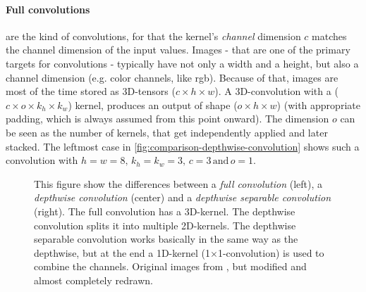 \paragraph{Full convolutions} are the kind of convolutions, for that the kernel's \emph{channel} dimension $c$ matches the channel dimension of the input values.
Images - that are one of the primary targets for convolutions - typically have not only a width and a height, but also a channel dimension (e.g. color channels, like rgb).
Because of that, images are most of the time stored as 3D-tensors ($c \times h \times w$).
A 3D-convolution with a ($c \times o \times k_h \times k_w$) kernel, produces an output of shape ($o \times h \times w$) (with appropriate padding, which is always assumed from this point onward).
The dimension $o$ can be seen as the number of kernels, that get independently applied and later stacked.
The leftmost case in \autoref{fig:comparison-depthwise-convolution} shows such a convolution with $h = w=8,\, k_h =k_w = 3,\, c = 3 \mathrm{\,and\,} o=1$.

\begin{figure}[htbp]
    \centering
    \caption{This figure show the differences between a \emph{full convolution} (left), a \emph{depthwise convolution}  (center) and a \emph{depthwise separable convolution} (right).
    The full convolution has a 3D-kernel. 
    The depthwise convolution splits it into multiple 2D-kernels.
    The depthwise separable convolution works basically in the same way as the depthwise, but at the end a 1D-kernel (1$\times$1-convolution) is used to combine the channels.
     Original images from \cite{separableConvolutions}, but modified and almost completely redrawn.}
    \label{fig:comparison-depthwise-convolution}
\end{figure}

